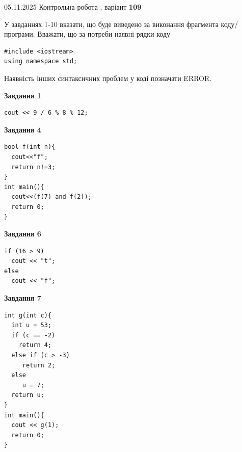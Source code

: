 \documentclass[12pt, ukrainian]{article}
\begin{document}
{\Large{05.11.2025 Контрольна робота , варіант  \No \textbf { 109 }\par}}
{
\begin {large}
У завданнях 1-10 вказати, що буде виведено за виконання фрагмента коду/про\-гра\-ми.
Вважати, що за потреби наявні рядки коду
\begin{verbatim}
#include <iostream>
using namespace std;
\end{verbatim}
Наявність інших синтаксичних проблем у коді позначати ERROR.

\begin{minipage}[t]{7.0cm}

\begin{center}
\textbf{Завдання 1}
\end{center}
\vspace{-8mm}

\begin{verbatim}
cout << 9 / 6 % 8 % 12;
\end{verbatim}



\begin{center}
\textbf{Завдання 4}
\end{center}
\vspace{-8mm}

\begin{verbatim}
bool f(int n){
  cout<<"f";
  return n!=3;
}
int main(){
  cout<<(f(7) and f(2));
  return 0;
}
\end{verbatim}



\begin{center}
\textbf{Завдання 6}
\end{center}
\vspace{-8mm}

\begin{verbatim}
if (16 > 9)
  cout << "t";
else
  cout << "f";
\end{verbatim}



\begin{center}
\textbf{Завдання 7}
\end{center}
\vspace{-8mm}

\begin{verbatim}
int g(int c){
  int u = 53;
  if (c == -2)
    return 4;
  else if (c > -3)
     return 2;
  else
     u = 7;
  return u;
}
int main(){
  cout << g(1);
  return 0;
}
\end{verbatim}


\end{minipage}
\end{large}}
\end{document}
